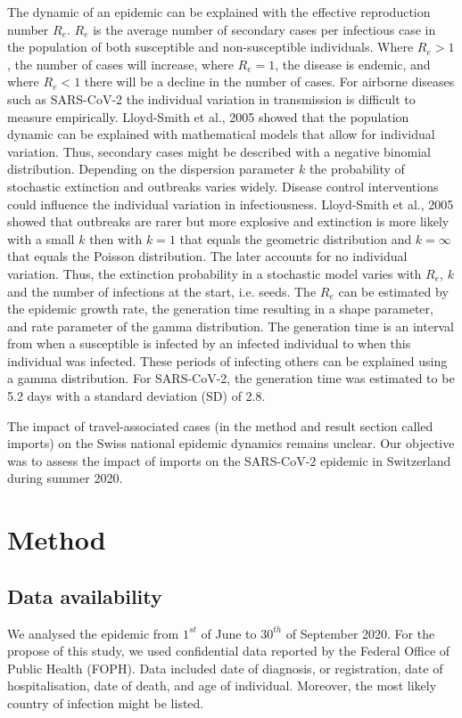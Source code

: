 \documentclass[10pt, a4paper, twoside]{article}
\begin{document}
\begin{multicols}{2}
The dynamic of an epidemic can be explained with the effective reproduction number $R_e$. 
$R_e$ is the average number of secondary cases per infectious case in the population of both susceptible and non-susceptible individuals. 
Where $R_e > 1$ , the number of cases will increase, where $R_e = 1$, the disease is endemic, and where $R_e < 1$ there will be a decline in the number of cases. 
For airborne diseases such as SARS-CoV-2 the individual variation in transmission is difficult to measure empirically. 
Lloyd-Smith et al., 2005 showed that the population dynamic can be explained with mathematical models that allow for individual variation.\cite{lloyd-smith_superspreading_2005}  
Thus, secondary cases might be described with a negative binomial distribution. Depending on the dispersion parameter $k$ the probability of stochastic extinction and outbreaks varies widely. 
Disease control interventions could influence the individual variation in infectiousness.\cite{lloyd-smith_superspreading_2005} 
Lloyd-Smith et al., 2005 showed that outbreaks are rarer but more explosive and extinction is more likely with a small $k$ then with $k = 1$ that equals the geometric distribution and $k = \infty$ that equals the Poisson distribution.\cite{lloyd-smith_superspreading_2005} 
The later accounts for no individual variation. 
Thus, the extinction probability in a stochastic model varies with $R_e$, $k$ and the number of infections at the start, i.e. seeds. 
The $R_e$ can be estimated by the epidemic growth rate, the generation time resulting in a shape parameter, and rate parameter of the gamma distribution. 
The generation time is an interval from when a susceptible is infected by an infected individual to when this individual was infected. 
These periods of infecting others can be explained using a gamma distribution. 
For SARS-CoV-2, the generation time was estimated to be 5.2 days with a standard deviation (SD) of 2.8.\cite{ganyani_estimating_2020}

The impact of travel-associated cases (in the method and result section called imports) on the Swiss national epidemic dynamics remains unclear.
Our objective was to assess the impact of imports on the SARS-CoV-2 epidemic in Switzerland during summer 2020.

\section{Method}

\subsection{Data availability}
We analysed the epidemic from $1^{st}$ of June to $30^{th}$ of September 2020. 
For the propose of this study, we used confidential data reported by the Federal Office of Public Health (FOPH). 
Data included date of diagnosis, or registration, date of hospitalisation, date of death, and age of individual. 
Moreover, the most likely country of infection might be listed.


\end{multicols}
\end{document}
